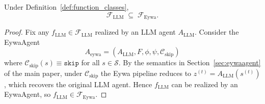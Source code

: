 \documentclass{llmxive}
\begin{document}
{\begin{proposition}
\label{prop:containment}
Under Definition~\ref{def:function_classes},
\[
\mathcal{F}_{\mathrm{LLM}}\;\subseteq\;\mathcal{F}_{\mathrm{Eywa}}.
\]
\end{proposition}
\begin{proof}
Fix any $f_{\mathrm{LLM}}\in\mathcal{F}_{\mathrm{LLM}}$ realized by an LLM agent $A_{\mathrm{LLM}}$. Consider the EywaAgent 
\begin{equation}
A_{\mathrm{eywa}}=(A_{\mathrm{LLM}},F,\phi,\psi,\mathcal{C}_{\mathrm{skip}})
\end{equation}
where $\mathcal{C}_{\mathrm{skip}}(s)\equiv\texttt{skip}$ for all $s\in\mathcal{S}$. By the semantics in Section~\ref{sec:eywaagent} of the main paper, under $\mathcal{C}_{\mathrm{skip}}$ the Eywa pipeline reduces to $z^{(t)}=A_{\mathrm{LLM}}(s^{(t)})$, which recovers the original LLM agent. Hence $f_{\mathrm{LLM}}$ can be realized by an EywaAgent, so $f_{\mathrm{LLM}}\in\mathcal{F}_{\mathrm{Eywa}}$.
\end{proof}

}
\end{document}
